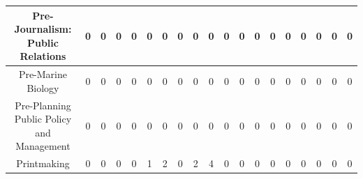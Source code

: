\documentclass[10]{article}
\begin{document}
\begin{landscape}
\begin{longtable}[c]{|ccccccccccccccccccc|}
	\multicolumn{1}{|c|}{Pre-Journalism: Public Relations}           & \multicolumn{1}{c|}{0}          & \multicolumn{1}{c|}{0}          & \multicolumn{1}{c|}{0}          & \multicolumn{1}{c|}{0}          & \multicolumn{1}{c|}{0}          & \multicolumn{1}{c|}{0}          & \multicolumn{1}{c|}{0}          & \multicolumn{1}{c|}{0}          & \multicolumn{1}{c|}{0}          & \multicolumn{1}{c|}{0}          & \multicolumn{1}{c|}{0}          & \multicolumn{1}{c|}{0}          & \multicolumn{1}{c|}{0}          & \multicolumn{1}{c|}{0}          & \multicolumn{1}{c|}{0}          & \multicolumn{1}{c|}{0}          & \multicolumn{1}{c|}{0}          & 0          \\ \hline
	\multicolumn{1}{|c|}{Pre-Marine Biology}                         & \multicolumn{1}{c|}{0}          & \multicolumn{1}{c|}{0}          & \multicolumn{1}{c|}{0}          & \multicolumn{1}{c|}{0}          & \multicolumn{1}{c|}{0}          & \multicolumn{1}{c|}{0}          & \multicolumn{1}{c|}{0}          & \multicolumn{1}{c|}{0}          & \multicolumn{1}{c|}{0}          & \multicolumn{1}{c|}{0}          & \multicolumn{1}{c|}{0}          & \multicolumn{1}{c|}{0}          & \multicolumn{1}{c|}{0}          & \multicolumn{1}{c|}{0}          & \multicolumn{1}{c|}{0}          & \multicolumn{1}{c|}{0}          & \multicolumn{1}{c|}{0}          & 0          \\ \hline
	\multicolumn{1}{|c|}{Pre-Planning Public Policy and Management}  & \multicolumn{1}{c|}{0}          & \multicolumn{1}{c|}{0}          & \multicolumn{1}{c|}{0}          & \multicolumn{1}{c|}{0}          & \multicolumn{1}{c|}{0}          & \multicolumn{1}{c|}{0}          & \multicolumn{1}{c|}{0}          & \multicolumn{1}{c|}{0}          & \multicolumn{1}{c|}{0}          & \multicolumn{1}{c|}{0}          & \multicolumn{1}{c|}{0}          & \multicolumn{1}{c|}{0}          & \multicolumn{1}{c|}{0}          & \multicolumn{1}{c|}{0}          & \multicolumn{1}{c|}{0}          & \multicolumn{1}{c|}{0}          & \multicolumn{1}{c|}{0}          & 0          \\ \hline
	\multicolumn{1}{|c|}{Printmaking}                                & \multicolumn{1}{c|}{0}          & \multicolumn{1}{c|}{0}          & \multicolumn{1}{c|}{0}          & \multicolumn{1}{c|}{0}          & \multicolumn{1}{c|}{1}          & \multicolumn{1}{c|}{2}          & \multicolumn{1}{c|}{0}          & \multicolumn{1}{c|}{2}          & \multicolumn{1}{c|}{4}          & \multicolumn{1}{c|}{0}          & \multicolumn{1}{c|}{0}          & \multicolumn{1}{c|}{0}          & \multicolumn{1}{c|}{0}          & \multicolumn{1}{c|}{0}          & \multicolumn{1}{c|}{0}          & \multicolumn{1}{c|}{0}          & \multicolumn{1}{c|}{0}          & 0          \\ \hline

\end{longtable}
\end{landscape}
\end{document}
